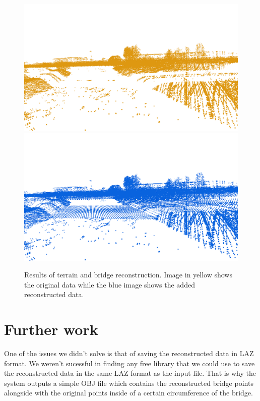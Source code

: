 \documentclass{egpubl-eurovis-star}
\begin{document}
\begin{figure}[ht]
    \centering
    \includegraphics[width=1\columnwidth]{front_pre.png}
    \includegraphics[width=1\columnwidth]{front_br.png}
    \caption{Results of terrain and bridge reconstruction. Image in yellow shows the original data while the blue image shows the added reconstructed data.}
    \label{fig4}
\end{figure}


\section{Further work}

One of the issues we didn't solve is that of saving the reconstructed data in LAZ format.
We weren't sucessful in finding any free library that we could use to save the reconstructed data in the same LAZ format as the input file.
That is why the system outputs a simple OBJ file which contains the reconstructed bridge points alongside with the original points inside of a certain circumference of the bridge.
\end{document}
